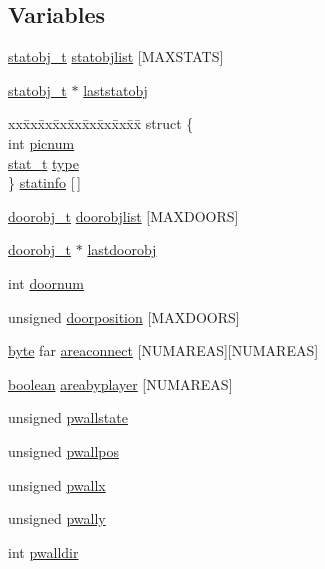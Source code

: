 \subsection*{Variables}
\begin{DoxyCompactItemize}
\item 
\hyperlink{structstatstruct}{statobj\_\-t} \hyperlink{WL__ACT1_8C_a64d166fbf5120795eaf1881a692b6360}{statobjlist} \mbox{[}MAXSTATS\mbox{]}
\item 
\hyperlink{structstatstruct}{statobj\_\-t} $\ast$ \hyperlink{WL__ACT1_8C_a6797183a5cacdaf405abbbcb02881132}{laststatobj}
\item 
\begin{tabbing}
xx\=xx\=xx\=xx\=xx\=xx\=xx\=xx\=xx\=\kill
struct \{\\
\>int \hyperlink{WL__ACT1_8C_a38ee8916c0c328929ad672895daca6d6}{picnum}\\
\>\hyperlink{WL__DEF_8H_aba6727854ac6a393ef9918fe0c42500f}{stat\_t} \hyperlink{WL__ACT1_8C_ac6913ebc2a188919d185cadc155a48cd}{type}\\
\} \hyperlink{WL__ACT1_8C_afb2ad9ecec71ef6c2ac2df5b4e3326bf}{statinfo} \mbox{[}$\,$\mbox{]}\\

\end{tabbing}\item 
\hyperlink{structdoorstruct}{doorobj\_\-t} \hyperlink{WL__ACT1_8C_a1db92e07e7d240d5f227fa9125a7a607}{doorobjlist} \mbox{[}MAXDOORS\mbox{]}
\item 
\hyperlink{structdoorstruct}{doorobj\_\-t} $\ast$ \hyperlink{WL__ACT1_8C_a21442011799a426226eec3654541de23}{lastdoorobj}
\item 
int \hyperlink{WL__ACT1_8C_a270ac0143523da1acaf3ad63e7c9f103}{doornum}
\item 
unsigned \hyperlink{WL__ACT1_8C_a40e94301053d665ef509efdce52da5cb}{doorposition} \mbox{[}MAXDOORS\mbox{]}
\item 
\hyperlink{ID__HEAD_8H_a0c8186d9b9b7880309c27230bbb5e69d}{byte} far \hyperlink{WL__ACT1_8C_a508c3e1ce5df30e83a5b0d8711d6422b}{areaconnect} \mbox{[}NUMAREAS\mbox{]}\mbox{[}NUMAREAS\mbox{]}
\item 
\hyperlink{ID__HEAD_8H_a7c6368b321bd9acd0149b030bb8275ed}{boolean} \hyperlink{WL__ACT1_8C_a59682b519d59a900dd195516111d7cc4}{areabyplayer} \mbox{[}NUMAREAS\mbox{]}
\item 
unsigned \hyperlink{WL__ACT1_8C_aeaaf2c9c46920d834ddd1b3f22b51378}{pwallstate}
\item 
unsigned \hyperlink{WL__ACT1_8C_a02920979fad1fa03663ac63efaabc2a5}{pwallpos}
\item 
unsigned \hyperlink{WL__ACT1_8C_af83d84af47696a055efab255b82e0b41}{pwallx}
\item 
unsigned \hyperlink{WL__ACT1_8C_aceefed33cfcf3369c2b94d0ea3f5f129}{pwally}
\item 
int \hyperlink{WL__ACT1_8C_a0bb9addf1c68a7920598824991a4a290}{pwalldir}
\end{DoxyCompactItemize}


